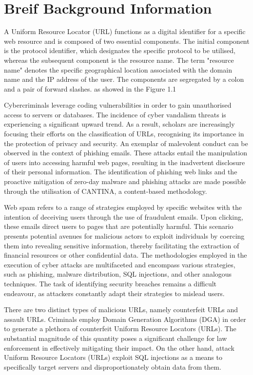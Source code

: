 \section{Breif Background Information}
A Uniform Resource Locator (URL) functions as a digital identifier for a specific web resource and is composed of two essential components. The initial component is the protocol identifier, which designates the specific protocol to be utilised, whereas the subsequent component is the resource name. The term "resource name" denotes the specific geographical location associated with the domain name and the IP address of the user. The components are segregated by a colon and a pair of forward slashes.\cite{MOHANTY20231668} as showed in the Figure 1.1



Cybercriminals leverage coding vulnerabilities in order to gain unauthorised access to servers or databases. The incidence of cyber vandalism threats is experiencing a significant upward trend. As a result, scholars are increasingly focusing their efforts on the classification of URLs, recognising its importance in the protection of privacy and security. An exemplar of malevolent conduct can be observed in the context of phishing emails. These attacks entail the manipulation of users into accessing harmful web pages, resulting in the inadvertent disclosure of their personal information. The identification of phishing web links and the proactive mitigation of zero-day malware and phishing attacks are made possible through the utilisation of CANTINA, a content-based methodology.\cite{Anjali}

Web spam refers to a range of strategies employed by specific websites with the intention of deceiving users through the use of fraudulent emails.\cite{Aljabri2022DetectingMU} Upon clicking, these emails direct users to pages that are potentially harmful. This scenario presents potential avenues for malicious actors to exploit individuals by coercing them into revealing sensitive information, thereby facilitating the extraction of financial resources or other confidential data. The methodologies employed in the execution of cyber attacks are multifaceted and encompass various strategies, such as phishing, malware distribution, SQL injections, and other analogous techniques. The task of identifying security breaches remains a difficult endeavour, as attackers constantly adapt their strategies to mislead users.

There are two distinct types of malicious URLs, namely counterfeit URLs and assault URLs. Criminals employ Domain Generation Algorithms (DGA) in order to generate a plethora of counterfeit Uniform Resource Locators (URLs). The substantial magnitude of this quantity poses a significant challenge for law enforcement in effectively mitigating their impact. On the other hand, attack Uniform Resource Locators (URLs) exploit SQL injections\cite{vijayalakshmi2020web} as a means to specifically target servers and disproportionately obtain data from them.\cite{Zhuofan}
